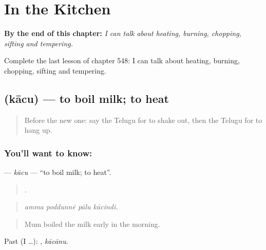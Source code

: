 
\chapter{In the Kitchen}
\label{ch:te-in-the-kitchen}

\begin{chapteropening}
\textbf{By the end of this chapter:} \emph{I can talk about heating, burning, chopping, sifting and tempering.}

Complete the last lesson of chapter 548: I can talk about heating, burning, chopping, sifting and tempering.
\end{chapteropening}

\section[\texorpdfstring{\te{కాచు} (kācu)}{కాచు (kācu)}]{ (kācu) — to boil milk; to heat}

\label{lesson:TE-C548-kacu}



\begin{quote}
Before the new one: say the Telugu for to shake out, then the Telugu for to hang up.
\end{quote}

\subsection*{You'll want to know: }
\textbf{} — \emph{kācu} — \textquotedblleft{}to boil milk; to heat\textquotedblright{}.

\begin{quote}
   .
\end{quote}

\begin{quote}
\emph{amma poddunnē pālu kācindi.}
\end{quote}

\begin{quote}
Mum boiled the milk early in the morning.
\end{quote}

Past (I …): , \emph{kācānu}.

